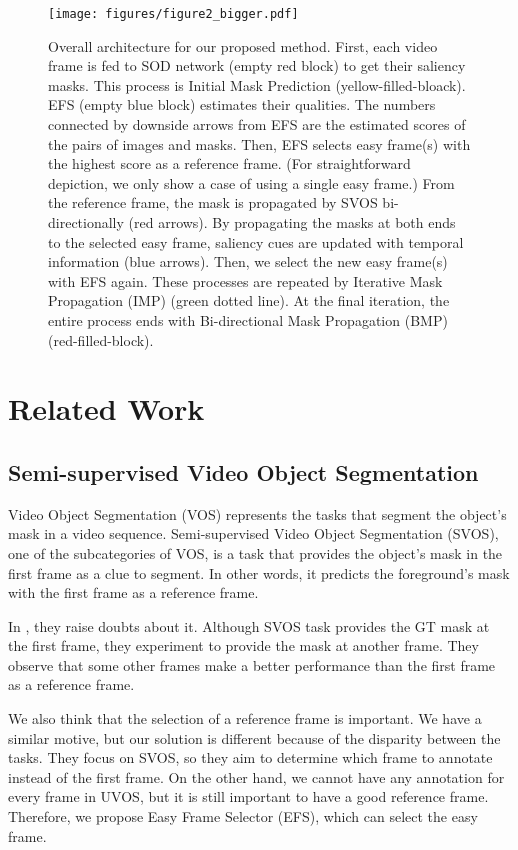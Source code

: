 \documentclass[letterpaper]{article} \usepackage{aaai22}  \usepackage{times}  \usepackage{helvet}  \usepackage{courier}  \usepackage[hyphens]{url}  \usepackage{graphicx} \urlstyle{rm} \def\UrlFont{\rm}  \usepackage{natbib}  \usepackage{caption} \DeclareCaptionStyle{ruled}{labelfont=normalfont,labelsep=colon,strut=off} \frenchspacing  \setlength{\pdfpagewidth}{8.5in}  \setlength{\pdfpageheight}{11in}  \usepackage{algorithm}
\begin{document}
\begin{figure*}[!h]
\centering
\texttt{[image: figures/figure2\_bigger.pdf]}
\caption{Overall architecture for our proposed method. First, each video frame is fed to SOD network (empty red block) to get their saliency masks. This process is Initial Mask Prediction (yellow-filled-bloack). EFS (empty blue block) estimates their qualities. The numbers connected by downside arrows from EFS are the estimated scores of the pairs of images and masks. Then, EFS selects easy frame(s) with the highest score as a reference frame. (For straightforward depiction, we only show a case of using a single easy frame.) From the reference frame, the mask is propagated by SVOS bi-directionally (red arrows). By propagating the masks at both ends to the selected easy frame, saliency cues are updated with temporal information (blue arrows). Then, we select the new easy frame(s) with EFS again. These processes are repeated by Iterative Mask Propagation (IMP) (green dotted line). At the final iteration, the entire process ends with Bi-directional Mask Propagation (BMP) (red-filled-block).}
\label{figure2}
\end{figure*}

\section{Related Work}

\subsection{Semi-supervised Video Object Segmentation}

Video Object Segmentation (VOS) represents the tasks that segment the object’s mask in a video sequence. Semi-supervised Video Object Segmentation (SVOS), one of the subcategories of VOS, is a task that provides the object’s mask in the first frame as a clue to segment. In other words, it predicts the foreground’s mask with the first frame as a reference frame.

In \citet{griffin2019bubblenets}, they raise doubts about it. Although SVOS task provides the GT mask at the first frame, they experiment to provide the mask at another frame. They observe that some other frames make a better performance than the first frame as a reference frame.

We also think that the selection of a reference frame is important. We have a similar motive, but our solution is different because of the disparity between the tasks. They focus on SVOS, so they aim to determine which frame to annotate instead of the first frame. On the other hand, we cannot have any annotation for every frame in UVOS, but it is still important to have a good reference frame. Therefore, we propose Easy Frame Selector (EFS), which can select the easy frame. 
\end{document}
